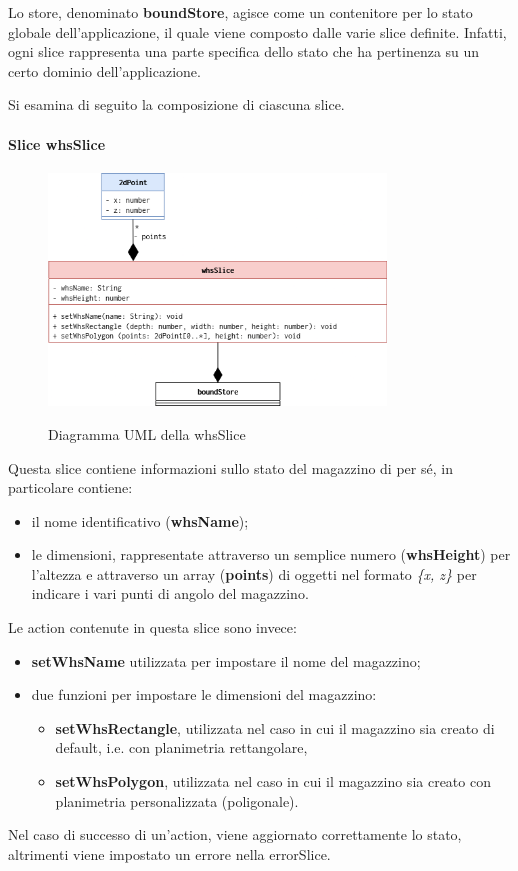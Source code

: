 Lo store, denominato \textbf{boundStore}, agisce come un contenitore per lo stato globale dell'applicazione, il quale viene composto dalle varie slice definite. Infatti, ogni slice rappresenta una parte specifica dello stato che ha pertinenza su un certo dominio dell'applicazione.

\bigskip
\noindent Si esamina di seguito la composizione di ciascuna slice. 

\paragraph{Slice whsSlice}
\begin{figure}[H]
    \centering
    \includegraphics[width=0.8\textwidth]{images/UML/feature_model_whsSlice.drawio.png}
    \label{fig:UML_whsSlice}
    \caption{Diagramma UML della whsSlice}
\end{figure}
Questa slice contiene informazioni sullo stato del magazzino di per sé, in particolare contiene:
\begin{itemize}
    \item il nome identificativo (\textbf{whsName}); 
    \item le dimensioni, rappresentate attraverso un semplice numero (\textbf{whsHeight}) per l'altezza e attraverso un array (\textbf{points}) di oggetti nel formato \textit{\{x, z\}} per indicare i vari punti di angolo del magazzino.
\end{itemize}

\noindent Le action contenute in questa slice sono invece:
\begin{itemize}
    \item \textbf{setWhsName} utilizzata per impostare il nome del magazzino;
    \item due funzioni per impostare le dimensioni del magazzino:
    \begin{itemize}
        \item \textbf{setWhsRectangle}, utilizzata nel caso in cui il magazzino sia creato di default, i.e. con planimetria rettangolare,
        \item \textbf{setWhsPolygon}, utilizzata nel caso in cui il magazzino sia creato con planimetria personalizzata (poligonale).
    \end{itemize}
\end{itemize}
Nel caso di successo di un'action, viene aggiornato correttamente lo stato, altrimenti viene impostato un errore nella errorSlice.


